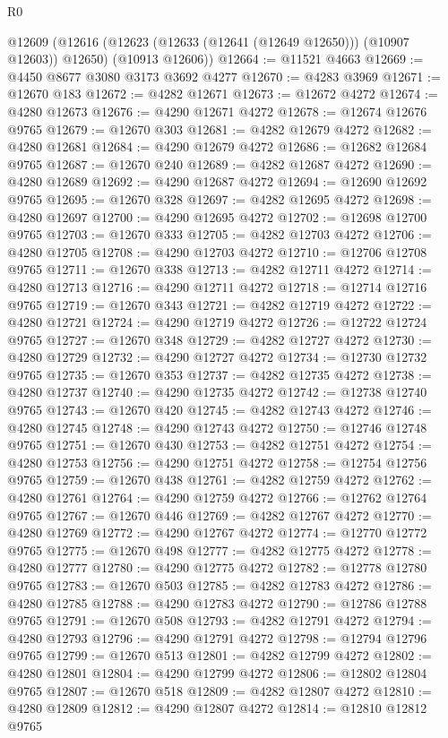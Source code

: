\begin{lexlean}{R0}
\begin{coremodule}
    @12609
      (@12616 (@12623 (@12633 (@12641 (@12649 @12650))) (@10907 @12603)) @12650)
      (@10913 @12606))
@12664 := @11521 @4663
@12669 := @4450 @8677 @3080 @3173 @3692 @4277
@12670 := @4283 @3969
@12671 := @12670 @183
@12672 := @4282 @12671
@12673 := @12672 @4272
@12674 := @4280 @12673
@12676 := @4290 @12671 @4272
@12678 := @12674 @12676 @9765
@12679 := @12670 @303
@12681 := @4282 @12679 @4272
@12682 := @4280 @12681
@12684 := @4290 @12679 @4272
@12686 := @12682 @12684 @9765
@12687 := @12670 @240
@12689 := @4282 @12687 @4272
@12690 := @4280 @12689
@12692 := @4290 @12687 @4272
@12694 := @12690 @12692 @9765
@12695 := @12670 @328
@12697 := @4282 @12695 @4272
@12698 := @4280 @12697
@12700 := @4290 @12695 @4272
@12702 := @12698 @12700 @9765
@12703 := @12670 @333
@12705 := @4282 @12703 @4272
@12706 := @4280 @12705
@12708 := @4290 @12703 @4272
@12710 := @12706 @12708 @9765
@12711 := @12670 @338
@12713 := @4282 @12711 @4272
@12714 := @4280 @12713
@12716 := @4290 @12711 @4272
@12718 := @12714 @12716 @9765
@12719 := @12670 @343
@12721 := @4282 @12719 @4272
@12722 := @4280 @12721
@12724 := @4290 @12719 @4272
@12726 := @12722 @12724 @9765
@12727 := @12670 @348
@12729 := @4282 @12727 @4272
@12730 := @4280 @12729
@12732 := @4290 @12727 @4272
@12734 := @12730 @12732 @9765
@12735 := @12670 @353
@12737 := @4282 @12735 @4272
@12738 := @4280 @12737
@12740 := @4290 @12735 @4272
@12742 := @12738 @12740 @9765
@12743 := @12670 @420
@12745 := @4282 @12743 @4272
@12746 := @4280 @12745
@12748 := @4290 @12743 @4272
@12750 := @12746 @12748 @9765
@12751 := @12670 @430
@12753 := @4282 @12751 @4272
@12754 := @4280 @12753
@12756 := @4290 @12751 @4272
@12758 := @12754 @12756 @9765
@12759 := @12670 @438
@12761 := @4282 @12759 @4272
@12762 := @4280 @12761
@12764 := @4290 @12759 @4272
@12766 := @12762 @12764 @9765
@12767 := @12670 @446
@12769 := @4282 @12767 @4272
@12770 := @4280 @12769
@12772 := @4290 @12767 @4272
@12774 := @12770 @12772 @9765
@12775 := @12670 @498
@12777 := @4282 @12775 @4272
@12778 := @4280 @12777
@12780 := @4290 @12775 @4272
@12782 := @12778 @12780 @9765
@12783 := @12670 @503
@12785 := @4282 @12783 @4272
@12786 := @4280 @12785
@12788 := @4290 @12783 @4272
@12790 := @12786 @12788 @9765
@12791 := @12670 @508
@12793 := @4282 @12791 @4272
@12794 := @4280 @12793
@12796 := @4290 @12791 @4272
@12798 := @12794 @12796 @9765
@12799 := @12670 @513
@12801 := @4282 @12799 @4272
@12802 := @4280 @12801
@12804 := @4290 @12799 @4272
@12806 := @12802 @12804 @9765
@12807 := @12670 @518
@12809 := @4282 @12807 @4272
@12810 := @4280 @12809
@12812 := @4290 @12807 @4272
@12814 := @12810 @12812 @9765

\end{coremodule}
\end{lexlean}
